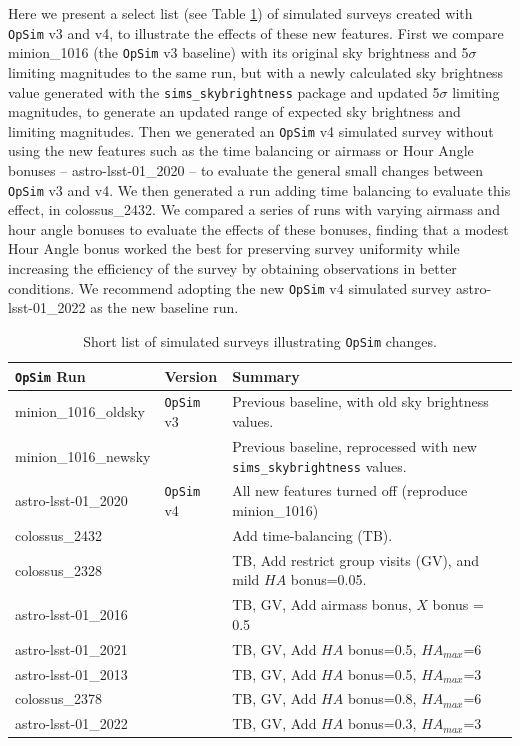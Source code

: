 \documentclass[DM,lsstdraft,authoryear,toc]{lsstdoc}
\newcommand{\opsim}{\texttt{OpSim}\xspace}
\newcommand{\simsky}{\texttt{sims\_skybrightness}\xspace}
\begin{document}
Here we present a select list (see Table \ref{tab:runlist}) of simulated surveys created with \opsim v3 and v4, to illustrate the effects of these new features. First we compare minion\_1016 (the \opsim v3 baseline) with its original sky brightness and 5$\sigma$ limiting magnitudes to the same run, but with a newly calculated sky brightness value generated with the \simsky package and updated 5$\sigma$ limiting magnitudes, to generate an updated range of expected sky brightness and limiting magnitudes. Then we generated an \opsim v4 simulated survey without using the new features such as the time balancing or airmass or Hour Angle bonuses -- astro-lsst-01\_2020 -- to evaluate the general small changes between \opsim v3 and v4. We then generated a run adding time balancing to evaluate this effect, in colossus\_2432.  We compared a series of runs with varying airmass and hour angle bonuses to evaluate the effects of these bonuses, finding that a modest Hour Angle bonus worked the best for preserving survey uniformity while increasing the efficiency of the survey by obtaining observations in better conditions. We recommend adopting the new \opsim v4 simulated survey astro-lsst-01\_2022 as the new baseline run.

\begin{table}[htp]
\caption{Short list of simulated surveys illustrating \opsim changes.}
\begin{center}
\begin{tabular}{ l | l | l }
\opsim Run & Version & Summary \\
\hline
minion\_1016\_oldsky & \opsim v3 & Previous baseline, with old sky brightness values. \\
minion\_1016\_newsky &  & Previous baseline, reprocessed with new \simsky values.\\
astro-lsst-01\_2020 & \opsim v4  & All new features turned off (reproduce minion\_1016) \\
colossus\_2432 &  & Add time-balancing (TB).\\
colossus\_2328 &  & TB, Add restrict group visits (GV), and mild $HA$ bonus=0.05. \\
astro-lsst-01\_2016 &  & TB, GV, Add airmass bonus, $X$ bonus = 0.5 \\
astro-lsst-01\_2021 & & TB, GV, Add $HA$ bonus=0.5, $HA_{max}$=6 \\
astro-lsst-01\_2013 &  & TB, GV, Add $HA$ bonus=0.5, $HA_{max}$=3 \\
colossus\_2378 &  &  TB, GV, Add $HA$ bonus=0.8, $HA_{max}$=6 \\
astro-lsst-01\_2022 &   & TB, GV, Add $HA$ bonus=0.3, $HA_{max}$=3 \\
\end{tabular} 
\end{center}
\label{tab:runlist}
\end{table}
\end{document}
